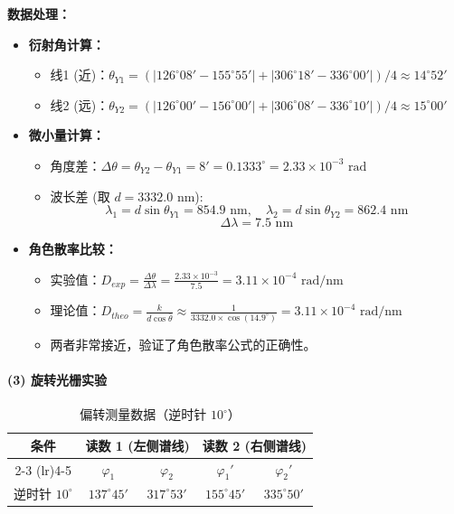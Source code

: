 \documentclass[]{../template/Report}%
\begin{document}
\begin{fullreportonly}
\textbf{数据处理：}
\begin{itemize}
    \item \textbf{衍射角计算：}
    \begin{itemize}
        \item 线1 (近)：$\theta_{Y1} = (|126^\circ 08' - 155^\circ 55'| + |306^\circ 18' - 336^\circ 00'|)/4 \approx 14^\circ 52'$
        \item 线2 (远)：$\theta_{Y2} = (|126^\circ 00' - 156^\circ 00'| + |306^\circ 08' - 336^\circ 10'|)/4 \approx 15^\circ 00'$
    \end{itemize}
    \item \textbf{微小量计算：}
    \begin{itemize}
        \item 角度差：$\Delta \theta = \theta_{Y2} - \theta_{Y1} = 8' = 0.1333^\circ = 2.33 \times 10^{-3} \text{ rad}$
        \item 波长差 (取 $d=3332.0 \text{ nm}$):
        \[
        \lambda_1 = d \sin \theta_{Y1} = 854.9 \text{ nm}, \quad \lambda_2 = d \sin \theta_{Y2} = 862.4 \text{ nm}
        \]
        \[
        \Delta \lambda = 7.5 \text{ nm}
        \]
    \end{itemize}
    \item \textbf{角色散率比较：}
    \begin{itemize}
        \item 实验值：$D_{exp} = \frac{\Delta \theta}{\Delta \lambda} = \frac{2.33 \times 10^{-3}}{7.5} = 3.11 \times 10^{-4} \text{ rad/nm}$
        \item 理论值：$D_{theo} = \frac{k}{d \cos \bar{\theta}} \approx \frac{1}{3332.0 \times \cos(14.9^\circ)} = 3.11 \times 10^{-4} \text{ rad/nm}$
        \item 两者非常接近，验证了角色散率公式的正确性。
    \end{itemize}
\end{itemize}

\paragraph{(3) 旋转光栅实验} \mbox{}
\begin{table}[H]
    \centering
    \caption{偏转测量数据（逆时针 $10^\circ$）}
    \begin{tabular}{ccccc}
        \toprule
        \multirow{2}{*}{条件} & \multicolumn{2}{c}{读数 1 (左侧谱线)} & \multicolumn{2}{c}{读数 2 (右侧谱线)} \\
        \cmidrule(lr){2-3} \cmidrule(lr){4-5}
         & $\varphi_1$ & $\varphi_2$ & $\varphi_1'$ & $\varphi_2'$ \\
        \midrule
        逆时针 $10^\circ$ & $137^\circ 45'$ & $317^\circ 53'$ & $155^\circ 45'$ & $335^\circ 50'$ \\
        \bottomrule
    \end{tabular}
\end{table}


\end{fullreportonly}
\end{document}
